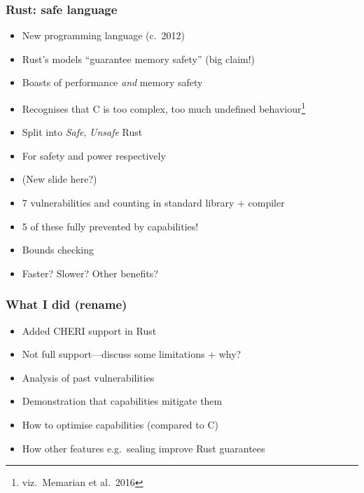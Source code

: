 \documentclass{beamer}
\begin{document}
\begin{frame}
\frametitle{Rust: safe language}

\begin{itemize}
    \item New programming language (c.\ 2012)
    \item Rust's models ``guarantee memory safety'' (big claim!)
    \item Boasts of performance \emph{and} memory safety
    \item Recognises that C is too complex, too much undefined behaviour\footnote{viz.\ Memarian et al.\ 2016}
    \item Split into \emph{Safe}, \emph{Unsafe} Rust
    \item For safety and power respectively
    \item (New slide here?)
    \item 7 vulnerabilities and counting in standard library + compiler
    \item 5 of these fully prevented by capabilities!
    \item Bounds checking
    \item Faster? Slower? Other benefits?
\end{itemize}
\end{frame}


\begin{frame}
\frametitle{What I did (rename)}

\begin{itemize}
    \item Added CHERI support in Rust
    \item Not full support---discuss some limitations + why?
    \item Analysis of past vulnerabilities
    \item Demonstration that capabilities mitigate them
    \item How to optimise capabilities (compared to C)
    \item How other features e.g.\ sealing improve Rust guarantees
\end{itemize}
\end{frame}
\end{document}
